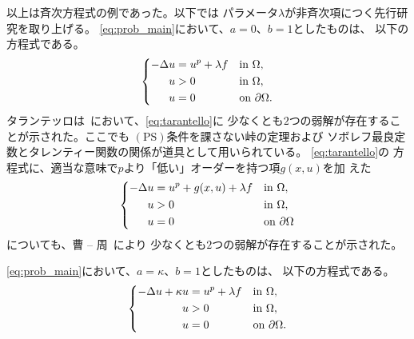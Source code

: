 以上は斉次方程式の例であった。以下では
パラメータ$\lambda$が非斉次項につく先行研究を取り上げる。
\ref{eq:prob_main}において、$a = 0$、$b = 1$としたものは、
以下の方程式である。
\begin{align}
 \left\{
 \begin{aligned}
  -\Delta u &= u^p + \lambda f  & &\text{in}~ \Omega,  \\
  u &> 0 & &\text{in}~ \Omega, \\
  u &= 0 & &\text{on}~ \partial\Omega.
 \end{aligned}
 \right. \label{eq:tarantello}
\end{align}
タランテッロは\cite{MR1168304}~において、\eqref{eq:tarantello}に
少なくとも$2$つの弱解が存在することが示された。ここでも
$(\mathrm{PS})$条件を課さない峠の定理および
ソボレフ最良定数とタレンティー関数の関係が道具として用いられている。
\eqref{eq:tarantello}の
方程式に、適当な意味で$p$より「低い」オーダーを持つ項$g(x, u)$を加
えた
\begin{align}
 \left\{
 \begin{aligned}
  -\Delta u &= u^p + g(x, u) + \lambda f  & &\text{in}~ \Omega,  \\
  u &> 0 & &\text{in}~ \Omega, \\
  u &= 0 & &\text{on}~ \partial\Omega
 \end{aligned}
 \right. \label{eq:tarantello2}
\end{align}
についても、曹 -- 周~\cite{MR1408672}により
少なくとも$2$つの弱解が存在することが示された。

\ref{eq:prob_main}において、$a = \kappa$、$b = 1$としたものは、
以下の方程式である。
\begin{align}
 \left\{
 \begin{aligned}
  -\Delta u + \kappa u &= u^p + \lambda f  & &\text{in}~ \Omega,  \\
  u &> 0 & &\text{in}~ \Omega, \\
  u &= 0 & &\text{on}~ \partial\Omega.
 \end{aligned}
 \right. \label{eq:naito_sato}
\end{align}

